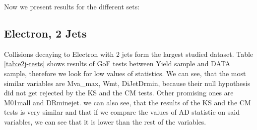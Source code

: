 Now we present results for the different sets:

\subsection{Electron, 2 Jets}
Collisions decaying to Electron with 2 jets form the largest studied dataset. Table \ref{tab:e2j-tests} shows results of GoF tests between Yield sample and DATA sample, therefore we look for low values of statistics. We can see, that the most similar variables are \textsf{Mva\_max, Wmt, DiJetDrmin}, because their null hypothesis did not   get rejected by the KS and the CM tests. Other promising ones are \textsf{M01mall and DRminejet}. we can also see, that the results of the KS and the CM tests is very similar and that if we compare the values of AD statistic on said variables, we can see that it is lower than the rest of the  variables. 

